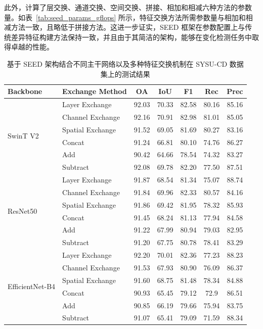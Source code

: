 此外，计算了层交换、通道交换、空间交换、拼接、相加和相减六种方法的参数量。如表~\ref{tab:seed_params_gflops} 所示，特征交换方法所需参数量与相加和相减方法一致，且略低于拼接方法。这进一步证实，SEED 框架在参数配置上与传统差异特征构建方法保持一致，并且由于其简洁的架构，能够在变化检测任务中取得卓越的性能。


\begin{table}[!htb]
\centering
\caption{基于 SEED 架构结合不同主干网络以及多种特征交换机制在 SYSU-CD 数据集上的测试结果}
\label{tab:seed_sysu_backbone}
\begin{tabular}{l l c c c c c}
\hline
\textbf{Backbone} & \textbf{Exchange Method} & \textbf{OA} & \textbf{IoU} & \textbf{F1} & \textbf{Rec} & \textbf{Prec} \\
\hline
\multirow{6}{*}{SwinT V2}
 & Layer Exchange    & 92.03 & 70.33 & 82.58 & 80.16 & 85.16 \\
 & Channel Exchange  & 92.16 & 70.91	& 82.98	& 81.01	& 85.05 \\
 & Spatial Exchange  & 91.52 & 69.05 & 81.69 & 80.27 & 83.16 \\
\cline{2-7}
 & Concat           & 91.24 & 66.81 & 80.10 & 74.76 & 86.27 \\
 & Add              & 90.42 & 64.66 & 78.54 & 74.32 & 83.27 \\
 & Subtract            & 92.08 & 69.78 & 82.20 & 77.50 & 87.51 \\
\hline
\multirow{6}{*}{ResNet50}
 & Layer Exchange    & 91.87 & 68.54 & 81.34 & 75.07 & 88.74 \\
 & Channel Exchange  & 91.84 & 69.96 & 82.33 & 80.57 & 84.16 \\
 & Spatial Exchange  & 91.86 & 69.42 & 81.95 & 78.32 & 85.93 \\
\cline{2-7}
 & Concat           & 91.45 & 68.24 & 81.13 & 77.94 & 84.58 \\
 & Add              & 91.22 & 67.99 & 80.94 & 79.03 & 82.95 \\
 & Subtract            & 91.20 & 67.75 & 80.78 & 78.41 & 83.29 \\
\hline
\multirow{6}{*}{EfficientNet-B4}
 & Layer Exchange    & 92.20 & 70.01 & 82.36 & 77.23 & 88.23 \\
 & Channel Exchange  & 91.53 & 67.93 & 80.90 & 76.09 & 86.37 \\    %
 & Spatial Exchange  & 91.60 & 68.75 & 81.48 & 78.34 & 84.88 \\    %
\cline{2-7}
 & Concat            & 90.93	& 65.45	& 79.12	& 72.9	& 86.51 \\
 & Add               & 90.85	& 66.19	& 79.66	& 75.94	& 83.75 \\
 & Subtract             & 91.07	& 65.41	& 79.09	& 71.59	& 88.34 \\

\hline
\end{tabular}
\end{table}

